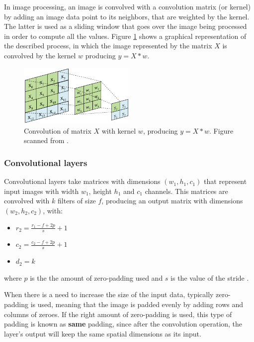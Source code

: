 In image processing, an image is convolved with a convolution matrix (or kernel) by adding an image data point to its neighbors, that are weighted by the kernel. The latter is used as a sliding window that goes over the image being processed in order to compute all the values. Figure \ref{fig:convolution} shows a graphical representation of the described process, in which the image represented by the matrix $X$ is convolved by the kernel $w$ producing $y = X\ast w$.

\begin{figure}
	\centering
	\includegraphics[width=0.5\textwidth]{images/convolution.png}
	\caption{Convolution of matrix $X$ with kernel $w$, producing $y = X\ast w$. Figure scanned from \cite{IMG:CONVOLUTION}.}
	\label{fig:convolution}
\end{figure}

\subsubsection*{Convolutional layers}
Convolutional layers take matrices with dimensions $(w_1, h_1, c_1)$ that represent input images with width $w_1$, height $h_1$ and $c_1$ channels. This matrices are convolved with $k$ filters of size $f$, producing an output matrix with dimensions $(w_2, h_2, c_2)$, with:
\begin{itemize}
	\item $r_2 = \frac{r_1 - f + 2p}{s} + 1$
	\item $c_2 = \frac{c_2 - f + 2p}{s} + 1$
	\item $d_2 = k$
\end{itemize}
where $p$ is the the amount of zero-padding used and $s$ is the value of the stride \cite{STANFORD}.

When there is a need to increase the size of the input data, typically zero-padding is used, meaning that the image is padded evenly by adding rows and columns of zeroes.
If the right amount of zero-padding is used, this type of padding is known as \textbf{same} padding, since after the convolution operation, the layer's output will keep the same spatial dimensions as its input.

